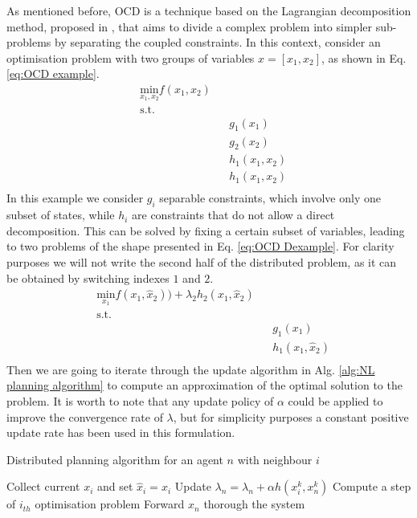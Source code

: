 \documentclass[a4paper,fleqn]{cas-sc}
\begin{document}
As mentioned before, OCD is a technique based on the Lagrangian decomposition method, proposed in  \cite{conejo2006decomposition}, that aims to divide a complex problem into simpler sub-problems by separating the coupled constraints. In this context, consider an optimisation problem with two groups of variables $x = [x_1, x_2]$, as shown in Eq. \eqref{eq:OCD example}. 
\begin{equation}
\label{eq:OCD example}
\begin{aligned}
    & \underset{x_1,x_2}{\text{min}}f(x_1,x_2) \\
    & \text{s.t.}\\
    &&& g_1(x_1) \\
    &&& g_2(x_2) \\
    &&& h_1(x_1,x_2)\\
    &&& h_1(x_1,x_2)\\
\end{aligned}
\end{equation}
In this example we consider $g_i$ separable constraints, which involve only one subset of states, while $h_i$ are constraints that do not allow a direct decomposition. This can be solved by fixing a certain subset of variables, leading to two problems of the shape presented in Eq. \eqref{eq:OCD Dexample}. For clarity purposes we will not write the second half of the distributed problem, as it can be obtained by switching indexes $1$ and $2$. 
\begin{equation}
\label{eq:OCD Dexample}
\begin{aligned}
    & \underset{x_1}{\text{min}}f(x_1,\hat{x}_2)) + {\lambda_2} h_2(x_1,\hat{x}_2)\\
    & \text{s.t.}\\
    &&& g_1(x_1) \\
    &&& h_1(x_1,\hat{x}_2)\\
\end{aligned}
\end{equation}
Then we are going to iterate through the update algorithm in Alg. \ref{alg:NL planning algorithm} to compute an approximation of the optimal solution to the problem. It is worth to note that any update policy of $\alpha$ could be applied to improve the convergence rate of $\lambda$, but for simplicity purposes a constant positive update rate has been used in this formulation. 

\begin{algorithm}[h]
\caption{Distributed planning algorithm for an agent $n$ with neighbour $i$}
\label{alg:NL planning algorithm}
   \State Collect current $x_i$ and set $\hat{x}_i = x_i$
   \State Update ${\lambda_n} = {\lambda_n} + \alpha h(x^k_i,x^k_n)$
    \State Compute a step of $i_{th}$ optimisation problem
    \State Forward $x_n$ thorough the system
\EndWhile
\end{algorithm}
\end{document}
